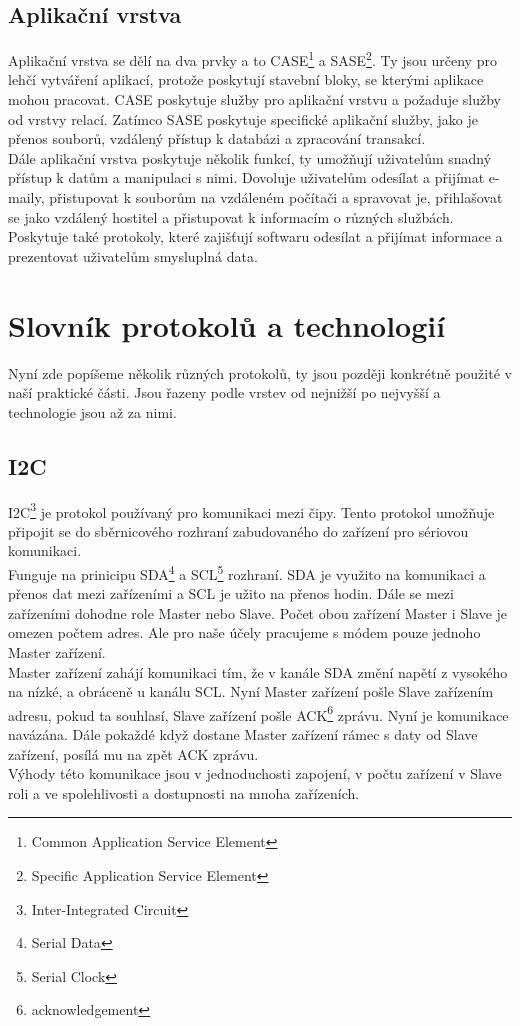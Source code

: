 \documentclass[12pt]{report}			%
\begin{document}
				\subsection{Aplikační vrstva}
Aplikační vrstva se dělí na dva prvky a to CASE\footnote{Common Application Service Element} a SASE\footnote{Specific Application Service Element}. Ty jsou určeny pro lehčí vytváření aplikací, protože poskytují stavební bloky, se kterými aplikace mohou pracovat. CASE poskytuje služby pro aplikační vrstvu a požaduje služby od vrstvy relací. Zatímco SASE poskytuje specifické aplikační služby, jako je přenos souborů, vzdálený přístup k databázi a zpracování transakcí.
\\
Dále aplikační vrstva poskytuje několik funkcí, ty umožňují uživatelům snadný přístup k datům a manipulaci s nimi. Dovoluje uživatelům odesílat a přijímat e-maily, přistupovat k souborům na vzdáleném počítači a spravovat je, přihlašovat se jako vzdálený hostitel a přistupovat k informacím o různých službách. Poskytuje také protokoly, které zajišťují softwaru odesílat a přijímat informace a prezentovat uživatelům smysluplná data.\cite{aplication1}\cite{aplication2}\cite{aplication3}


			\section{Slovník protokolů a technologií}
			
			
Nyní zde popíšeme několik různých protokolů, ty jsou později konkrétně použité v naší praktické části. Jsou řazeny podle vrstev od nejnižší po nejvyšší a technologie jsou až za nimi.


				\subsection{I2C}
				
				
I2C\footnote{Inter-Integrated Circuit} je protokol používaný pro komunikaci mezi čipy. Tento protokol umožňuje připojit se do sběrnicového rozhraní zabudovaného do zařízení pro sériovou komunikaci. 
\\
Funguje na prinicipu SDA\footnote{Serial Data} a SCL\footnote{Serial Clock} rozhraní. SDA je využito na komunikaci a přenos dat mezi zařízeními a SCL je užito na přenos hodin. Dále se mezi zařízeními dohodne role Master nebo Slave. Počet obou zařízení Master i Slave je omezen počtem adres. Ale pro naše účely pracujeme s módem pouze jednoho Master zařízení.
\\
 Master zařízení zahájí komunikaci tím, že v kanále SDA změní napětí z vysokého na nízké, a obráceně u kanálu SCL. Nyní Master zařízení pošle Slave zařízením adresu, pokud ta souhlasí, Slave zařízení pošle ACK\footnote{acknowledgement} zprávu. Nyní je komunikace navázána. Dále pokaždé když dostane Master zařízení rámec s daty od Slave zařízení, posílá mu na zpět ACK zprávu.
\\
Výhody této komunikace jsou v jednoduchosti zapojení, v počtu zařízení v Slave roli a ve spolehlivosti a dostupnosti na mnoha zařízeních.  \cite{i2c1}\cite{i2c2}\cite{i2c3}\cite{i2c4}
\end{document}
